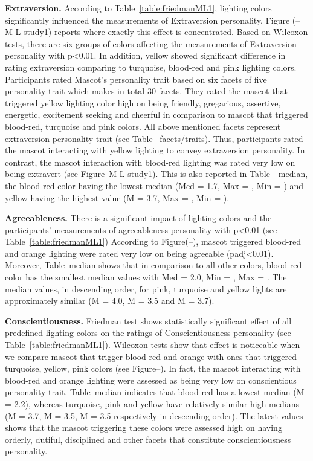 \par \textbf{Extraversion.}
According to Table~\ref{table:friedmanML1}, lighting colors significantly
influenced the measurements of Extraversion personality.
Figure (--M-L-study1) reports where exactly this effect is concentrated.
Based on Wilcoxon tests, there are six groups of colors affecting the
measurements of Extraversion personality with p<0.01.
In addition, yellow showed significant difference in rating extraversion
comparing to turquoise, blood-red and pink lighting colors.
Participants rated Mascot's personality trait based on six facets of five
personality trait which makes in total 30 facets.
They rated the mascot that triggered yellow lighting color high on being
friendly, gregarious, assertive, energetic, excitement seeking and
cheerful in comparison to mascot that triggered blood-red, turquoise and pink colors.
All above mentioned facets represent extraversion personality trait (see Table --facets/traits).
Thus, participants rated the mascot interacting with yellow lighting to convey extraversion personality.
In contrast, the mascot interaction with blood-red lighting was
rated very low on being extravert (see Figure--M-L-study1).
This is also reported in Table---median, the blood-red color having
the lowest median (Med = 1.7, Max = , Min = ) and yellow having the highest
value (M = 3.7, Max = , Min = ).

\par \textbf{Agreeableness.}
There is a significant impact of lighting colors and the participants'
measurements of agreeableness personality with p<0.01 (see Table~\ref{table:friedmanML1})
According to Figure(--), mascot triggered blood-red and orange lighting
were rated very low on being agreeable (padj<0.01).
Moreover, Table--median shows that in comparison to all other colors,
blood-red color has the smallest median values with Med = 2.0, Min = , Max = .
The median values, in descending order, for pink, turquoise and yellow lights are
approximately similar (M = 4.0, M = 3.5 and M = 3.7).

\par \textbf{Conscientiousness.}
Friedman test shows statistically significant effect of all predefined lighting colors
on the ratings of Conscientiousness personality (see Table~\ref{table:friedmanML1}).
Wilcoxon tests show that effect is noticeable when we compare mascot that trigger
blood-red and orange with ones that triggered turquoise, yellow, pink colors (see Figure--).
In fact, the mascot interacting with blood-red and orange lighting were assessed
as being very low on conscientious personality trait.
Table--median indicates that blood-red has a lowest median (M = 2.2), whereas turquoise, pink and
yellow have relatively similar high medians (M = 3.7, M = 3.5, M = 3.5 respectively in descending order).
The latest values shows that the mascot triggering these colors were assessed high on having
orderly, dutiful, disciplined and other facets that constitute conscientiousness personality.


